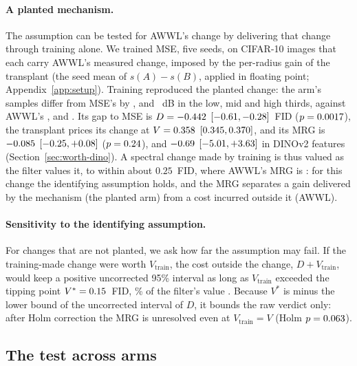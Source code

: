\paragraph{A planted mechanism.}
\label{sec:worth-planted}
The assumption can be tested for AWWL's change by delivering that change
through training alone. We trained MSE, five seeds, on CIFAR-10 images that
each carry AWWL's measured change, imposed by the per-radius gain of the
transplant (the seed mean of $s(A) - s(B)$, applied in floating point;
Appendix~\ref{app:setup}). Training reproduced the planted change: the arm's
samples differ from MSE's by \corrPlantedLow, \corrPlantedMid{} and
\corrPlantedHigh~dB in the low, mid and high thirds, against AWWL's
\corrLowAWWL, \corrMidAWWL{} and \corrHighAWWL. Its gap to MSE is
$D = -0.442$ $[-0.61, -0.28]$~FID ($p = 0.0017$), the
transplant prices its change at $V = 0.358$
$[0.345, 0.370]$, and its MRG is $-0.085$
$[-0.25, +0.08]$ ($p = 0.24$), and $-0.69$
$[-5.01, +3.63]$ in DINOv2 features
(Section~\ref{sec:worth-dino}). A spectral change made by training is thus
valued as the filter values it, to within about $0.25$~FID, where AWWL's MRG
is \mrgMain: for this change the identifying assumption holds, and the MRG
separates a gain delivered by the mechanism (the planted arm) from a cost
incurred outside it (AWWL).

\paragraph{Sensitivity to the identifying assumption.}
For changes that are not planted, we ask how far the assumption may fail. If the
training-made change were worth $V_{\mathrm{train}}$, the cost outside the
change, $D + V_{\mathrm{train}}$, would keep a positive uncorrected 95\%
interval as long as $V_{\mathrm{train}}$ exceeded the tipping point
$V^\ast = 0.15$~FID, \tipShare\% of the filter's value
\priceTransplantValue. Because $V^\ast$ is minus the lower bound of the
uncorrected interval of $D$, it bounds the raw verdict only: after Holm
correction the MRG is unresolved even at $V_{\mathrm{train}} = V$
(Holm $p = 0.063$).

\subsection{The test across arms}
\label{sec:worth-arms}


